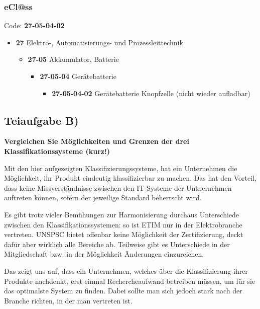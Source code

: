 \subsubsection{eCl@ss}
Code: \textbf{27-05-04-02}
\begin{itemize}
  \item  \textbf{27} Elektro-, Automatisierungs- und Prozessleittechnik
  \begin{itemize}
    \item \textbf{27-05} Akkumulator, Batterie
    \begin{itemize}
      \item  \textbf{27-05-04} Gerätebatterie
      	\begin{itemize}
	      \item  \textbf{27-05-04-02} Gerätebatterie Knopfzelle (nicht wieder aufladbar)
	    \end{itemize}
    \end{itemize}
   \end{itemize}
\end{itemize}
\clearpage

\subsection{Teiaufgabe B)}
\textbf{Vergleichen Sie Möglichkeiten und Grenzen der drei Klassifikationssysteme (kurz!)}

Mit den hier aufgezeigten Klassifizierungssysteme, hat ein Unternehmen die
Möglichkeit, ihr Produkt eindeutig klassifizierbar zu machen. Das hat den
Vorteil, dass keine Missverständnisse zwischen den IT-Systeme der Untnernehmen
auftreten können, sofern der jeweilige Standard beherrscht wird.

Es gibt trotz vieler Bemühungen zur Harmonisierung durchaus Unterschiede
zwischen den Klassifikationssystemen: so ist ETIM \zB nur in der Elektrobranche
vertreten. UNSPSC bietet offenbar keine Möglichkeit der Zertifizierung, deckt dafür aber
wirklich alle Bereiche ab. Teilweise gibt es Unterschiede in der Mitgliedschaft
bzw. in der Möglichkeit Änderungen einzureichen.

Das zeigt uns auf, dass ein Unternehmen, welches über die Klassifizierung ihrer
Produkte nachdenkt, erst einmal Rechercheaufwand betreiben müssen, um für sie
das optimalste System zu finden. Dabei sollte man sich jedoch stark nach der
Branche richten, in der man vertreten ist.

\clearpage 